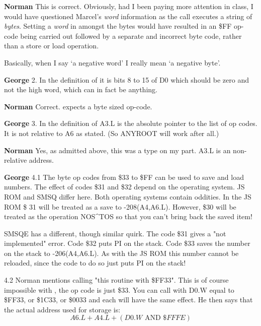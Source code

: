 {\bf Norman} 
This is correct. Obviously, had
    I been paying more attention in class, I would have questioned Marcel's
 \emph{word} information as the  call executes a string of \emph{bytes}. Setting
    a \emph{word} in amongst the bytes would have resulted in an \$FF op-{}code being
    carried out followed by a separate and incorrect byte code, rather than a
    store or load operation.



Basically, when I say `a negative word' I really mean `a negative
    byte'.

{\bf George} 
2. In the definition of 
    it is bits 8 to 15 of D0 which should be zero and not the high word, which
    can in fact be anything.



{\bf Norman} 
Correct.  expects a byte sized op-{}code.



{\bf George} 
3. In the definition of 
    A3.L is the absolute pointer to the list of op codes. It is not relative
    to A6 as stated. (So ANYROOT will work after all.)



{\bf Norman} 
Yes, as admitted above, this was
    a type on my part. A3.L is an non-{} relative address.



{\bf George} 
4.1 The byte op codes from \$33
    to \$FF can be used to save and load numbers. The effect of codes \$31 and
    \$32 depend on the operating system. JS ROM and SMSQ differ here. Both
    operating systems contain oddities. In the JS ROM \$ 31 will be treated as
    a save to -{}208(A4,A6.L). However, \$30 will be treated as the operation
    NOS\^{}TOS so that you can't bring back the saved item!



SMSQE has a different, though similar quirk. The code \$31 gives a
    "not implemented" error. Code \$32 puts PI on the stack. Code \$33 saves the
    number on the stack to -{}206(A4,A6.L). As with the JS ROM this number
    cannot be reloaded, since the code to do so just puts PI on the
    stack!

4.2 Norman mentions calling "this routine with \$FF33". This is of
    course impossible with , the op code is just \$33. You can call
     with D0.W equal to \$FF33, or \$1C33, or \$0033 and each will have
    the same effect. He then says that the actual address used for storage
    is: $$A6.L + A4.L + (D0.W \text{ AND } \$FFFE)$$

